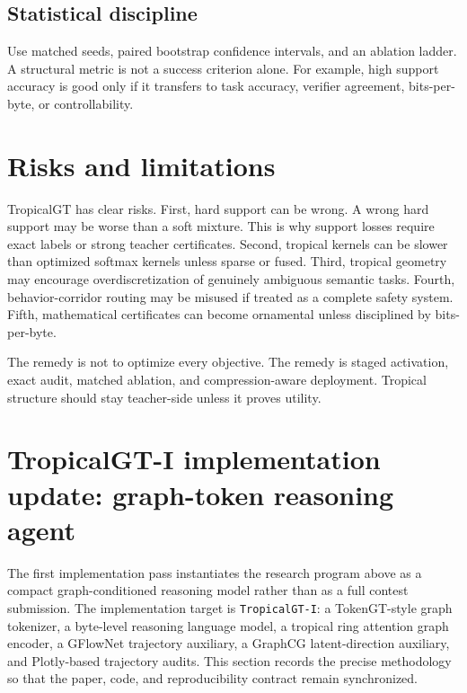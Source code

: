 \documentclass[11pt]{article}
\begin{document}
\subsection{Statistical discipline}

Use matched seeds, paired bootstrap confidence intervals, and an ablation ladder.  A structural metric is not a success criterion alone.  For example, high support accuracy is good only if it transfers to task accuracy, verifier agreement, bits-per-byte, or controllability.

\section{Risks and limitations}

TropicalGT has clear risks.  First, hard support can be wrong.  A wrong hard support may be worse than a soft mixture.  This is why support losses require exact labels or strong teacher certificates.  Second, tropical kernels can be slower than optimized softmax kernels unless sparse or fused.  Third, tropical geometry may encourage overdiscretization of genuinely ambiguous semantic tasks.  Fourth, behavior-corridor routing may be misused if treated as a complete safety system.  Fifth, mathematical certificates can become ornamental unless disciplined by bits-per-byte.

The remedy is not to optimize every objective.  The remedy is staged activation, exact audit, matched ablation, and compression-aware deployment.  Tropical structure should stay teacher-side unless it proves utility.


\section{TropicalGT-I implementation update: graph-token reasoning agent}
\label{sec:tropicalgt-i-implementation-update}

The first implementation pass instantiates the research program above as a compact graph-conditioned reasoning model rather than as a full contest submission.  The implementation target is \texttt{TropicalGT-I}: a TokenGT-style graph tokenizer, a byte-level reasoning language model, a tropical ring attention graph encoder, a GFlowNet trajectory auxiliary, a GraphCG latent-direction auxiliary, and Plotly-based trajectory audits.  This section records the precise methodology so that the paper, code, and reproducibility contract remain synchronized.
\end{document}
